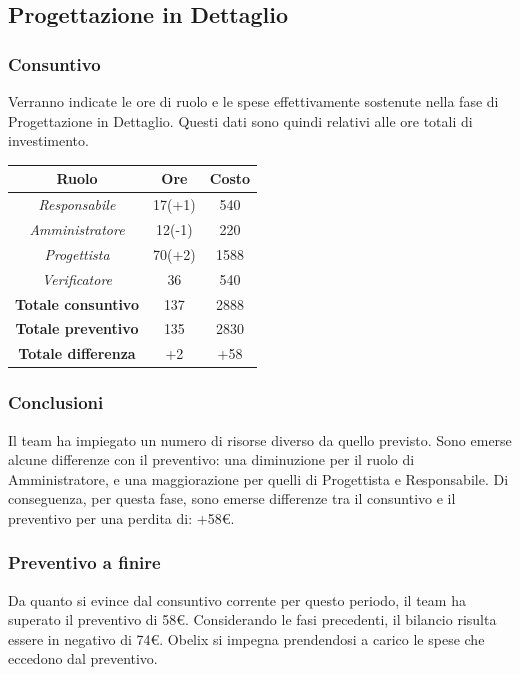 \subsection{Progettazione in Dettaglio}

\subsubsection{Consuntivo}

Verranno indicate le ore di ruolo e le spese effettivamente sostenute nella fase di Progettazione in Dettaglio. Questi dati sono quindi relativi alle ore totali di investimento.

\begin{center}
	\centering
	\begin{tabular}{|c|c|c|}
		\hline
		\textbf{Ruolo} & \textbf{Ore} & \textbf{Costo} \\
		\hline
		\emph{Responsabile}  & 17(+1) & 540 \\
		\hline  \emph{Amministratore}  & 12(-1) & 220 \\
		\hline  \emph{Progettista}  & 70(+2) & 1588 \\
		\hline  \emph{Verificatore}  & 36 & 540 \\
		\hline
		\textbf{Totale consuntivo} & 137 & 2888 \\
		\hline
		\textbf{Totale preventivo} & 135 & 2830 \\
		\hline
		\textbf{Totale differenza} & +2 & +58 \\
		\hline
	\end{tabular}
	
\end{center}

\subsubsection{Conclusioni}

Il team ha impiegato un numero di risorse diverso da quello previsto. Sono emerse alcune differenze con il preventivo: una diminuzione per il ruolo di Amministratore, e una maggiorazione per quelli di Progettista e Responsabile. Di conseguenza, per questa fase, sono emerse differenze tra il consuntivo e il preventivo per una perdita di: +58€.

\subsubsection{Preventivo a finire}
Da quanto si evince dal consuntivo corrente per questo periodo, il team ha superato il preventivo
di 58€. Considerando le fasi precedenti, il bilancio risulta essere in negativo di 74€. Obelix si impegna prendendosi a carico le spese che eccedono dal preventivo. 


